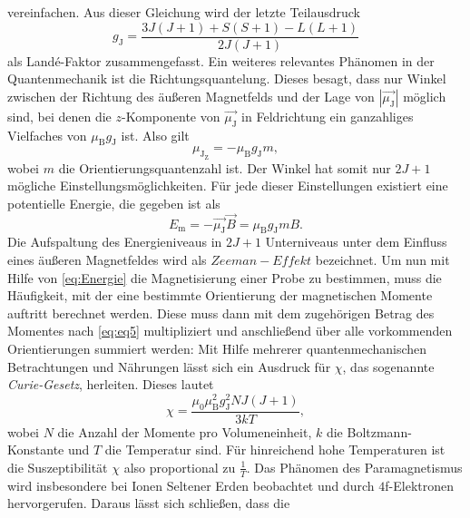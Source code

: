 vereinfachen. Aus dieser Gleichung wird der letzte Teilausdruck
\begin{equation}
	\label{eqn:landeF}
	g_\text{J} = \frac{3J(J+1)+S(S+1)-L(L+1)}{2J(J+1)}
\end{equation}
als Landé-Faktor zusammengefasst.
\newline
Ein weiteres relevantes Phänomen in der Quantenmechanik ist die Richtungsquantelung. Dieses besagt, dass nur Winkel zwischen der Richtung des äußeren Magnetfelds und der Lage von
$\left|\vec{\mu_\text{J}}\right|$ möglich sind, bei denen die $z$-Komponente von $\vec{\mu_\text{J}}$ in Feldrichtung ein ganzahliges Vielfaches von $\mu_\text{B}g_\text{J}$ ist.
Also gilt
\begin{equation}
\label{eq:eq5}
\mu_{\text{J}_\text{Z}} = - \mu_\text{B}g_\text{J}m,
\end{equation}
wobei $m$ die Orientierungsquantenzahl ist. Der Winkel hat somit nur $2J+1$ mögliche Einstellungsmöglichkeiten. Für jede dieser Einstellungen existiert eine potentielle Energie,
die gegeben ist als
\begin{equation}
	\label{eq:Energie}
	E_\text{m} = - \vec{\mu_\text{J}}\vec{B} = \mu_\text{B}g_\text{J}mB.
\end{equation}
Die Aufspaltung des Energieniveaus in $2J+1$ Unterniveaus unter dem Einfluss eines äußeren Magnetfeldes wird als $\mathit{Zeeman-Effekt}$ bezeichnet.
\newline
Um nun mit Hilfe von \autoref{eq:Energie} die Magnetisierung einer Probe zu bestimmen, muss die Häufigkeit, mit der eine bestimmte Orientierung der magnetischen Momente auftritt berechnet
werden. Diese muss dann mit dem zugehörigen Betrag des Momentes nach \autoref{eq:eq5} multipliziert und anschließend über alle vorkommenden Orientierungen summiert werden:
Mit Hilfe mehrerer quantenmechanischen Betrachtungen und Nährungen lässt sich ein Ausdruck für $\chi$, das sogenannte \textit{Curie-Gesetz}, herleiten.
Dieses lautet
\begin{equation}
\label{eq:mariecurie}
\chi = \frac{\mu_0\mu_\text{B}^{2}g_\text{J}^{2}NJ(J+1)}{3kT},
\end{equation}
wobei $N$ die Anzahl der Momente pro Volumeneinheit, $k$ die Boltzmann-Konstante und $T$ die Temperatur sind.
Für hinreichend hohe Temperaturen ist die Suszeptibilität $\chi$ also proportional zu $\frac{1}{T}$.
\newline
Das Phänomen des Paramagnetismus wird insbesondere bei Ionen Seltener Erden beobachtet und durch $4$f-Elektronen hervorgerufen. Daraus lässt sich schließen, dass die
